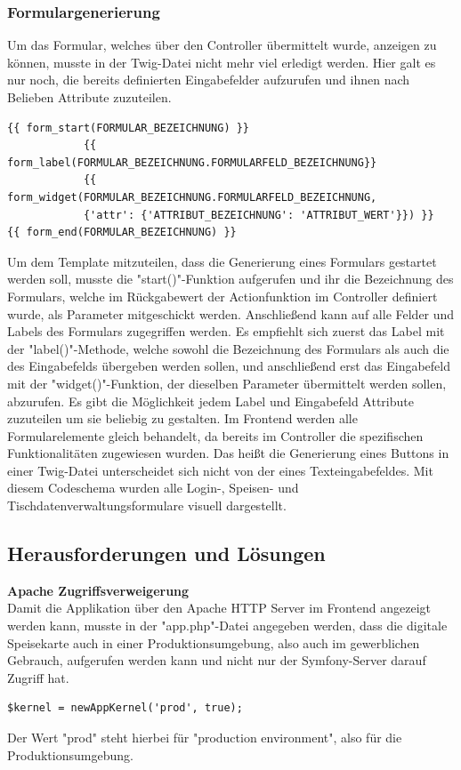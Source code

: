     \subsubsection{Formulargenerierung}

Um das Formular, welches über den Controller übermittelt wurde, anzeigen zu können, musste in der Twig-Datei nicht mehr viel erledigt werden. Hier galt es nur noch, die bereits definierten Eingabefelder aufzurufen und ihnen nach Belieben Attribute zuzuteilen.
\lstset{language = java}
  	\begin{lstlisting}
{{ form_start(FORMULAR_BEZEICHNUNG) }}
            {{ form_label(FORMULAR_BEZEICHNUNG.FORMULARFELD_BEZEICHNUNG}}
            {{ form_widget(FORMULAR_BEZEICHNUNG.FORMULARFELD_BEZEICHNUNG,
            {'attr': {'ATTRIBUT_BEZEICHNUNG': 'ATTRIBUT_WERT'}}) }}
{{ form_end(FORMULAR_BEZEICHNUNG) }}
	\end{lstlisting}
Um dem Template mitzuteilen, dass die Generierung eines Formulars gestartet werden soll, musste die "start()"-Funktion aufgerufen und ihr die Bezeichnung des Formulars, welche im Rückgabewert der Actionfunktion im Controller definiert wurde, als Parameter mitgeschickt werden.
Anschließend kann auf alle Felder und Labels des Formulars zugegriffen werden. Es empfiehlt sich zuerst das Label mit der "label()"-Methode, welche sowohl die Bezeichnung des Formulars als auch die des Eingabefelds übergeben werden sollen, und anschließend erst das Eingabefeld mit der "widget()"-Funktion, der dieselben Parameter übermittelt werden sollen, abzurufen. Es gibt die Möglichkeit jedem Label und Eingabefeld Attribute zuzuteilen um sie beliebig zu gestalten. Im Frontend werden alle Formularelemente gleich behandelt, da bereits im Controller die spezifischen Funktionalitäten zugewiesen wurden. Das heißt die Generierung eines Buttons in einer Twig-Datei unterscheidet sich nicht von der eines Texteingabefeldes.
Mit diesem Codeschema wurden alle Login-, Speisen- und Tischdatenverwaltungsformulare visuell dargestellt.

  \subsection{Herausforderungen und Lösungen}

\textbf{Apache Zugriffsverweigerung}\\
Damit die Applikation über den Apache HTTP Server im Frontend angezeigt werden kann, musste in der "app.php"-Datei angegeben werden, dass die digitale Speisekarte auch in einer Produktionsumgebung, also auch im gewerblichen Gebrauch, aufgerufen werden kann und nicht nur der Symfony-Server darauf Zugriff hat.
	\lstset{language=php}
  	\begin{lstlisting}
$kernel = newAppKernel('prod', true);
  	\end{lstlisting}
Der Wert "prod" steht hierbei für "production environment", also für die Produktionsumgebung.

